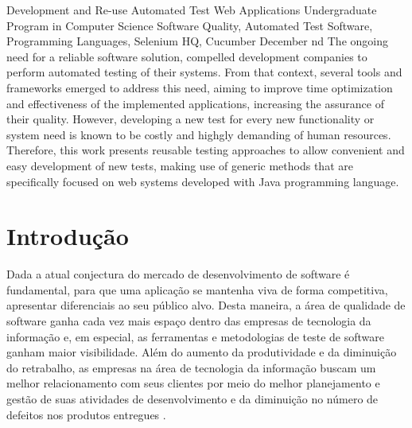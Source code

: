 \documentclass[tg]{mdtufsm}
\begin{document}
\begin{englishabstract}
{Development and Re-use Automated Test Web Applications}
{Undergraduate Program in Computer Science}
{Software Quality, Automated Test Software, Programming Languages, Selenium HQ, Cucumber}
{December}
{nd}
The ongoing need for a reliable software solution, compelled development companies to perform automated testing of their systems. From that context, several tools and frameworks emerged to address this need, aiming to improve time optimization and effectiveness of the implemented applications, increasing the assurance of their quality. However, developing a new test for every new functionality or system need is known to be costly and highgly demanding of human resources. Therefore, this work presents reusable testing approaches to allow convenient and easy development of new tests, making use of generic methods that are specifically focused on web systems developed with Java programming language.
\end{englishabstract}

\tableofcontents
\listoffigures
\listoftables

\setlength{\baselineskip}{1.5\baselineskip}


\chapter{Introdução}

Dada a atual conjectura do mercado de desenvolvimento de software é fundamental, para
que uma aplicação se mantenha viva de forma competitiva, apresentar diferenciais ao seu público alvo. Desta maneira, a área de qualidade de software ganha cada vez mais espaço dentro das empresas de tecnologia da informação e, em especial, as ferramentas e
metodologias de teste de software ganham maior visibilidade. Além do aumento da produtividade e da diminuição do retrabalho, as empresas na área de tecnologia da informação buscam um melhor relacionamento com seus clientes por meio do melhor planejamento e gestão de suas atividades de desenvolvimento e da diminuição no número de defeitos nos produtos entregues \cite{jomori2004qualidade}.
\end{document}
